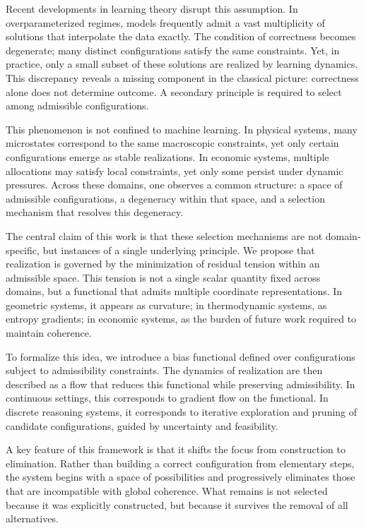 \documentclass[11pt]{article}
\theoremstyle{plain}
\theoremstyle{definition}
\theoremstyle{remark}
\begin{document}
Recent developments in learning theory disrupt this assumption. In overparameterized regimes, models frequently admit a vast multiplicity of solutions that interpolate the data exactly. The condition of correctness becomes degenerate; many distinct configurations satisfy the same constraints. Yet, in practice, only a small subset of these solutions are realized by learning dynamics. This discrepancy reveals a missing component in the classical picture: correctness alone does not determine outcome. A secondary principle is required to select among admissible configurations.

This phenomenon is not confined to machine learning. In physical systems, many microstates correspond to the same macroscopic constraints, yet only certain configurations emerge as stable realizations. In economic systems, multiple allocations may satisfy local constraints, yet only some persist under dynamic pressures. Across these domains, one observes a common structure: a space of admissible configurations, a degeneracy within that space, and a selection mechanism that resolves this degeneracy.

The central claim of this work is that these selection mechanisms are not domain-specific, but instances of a single underlying principle. We propose that realization is governed by the minimization of residual tension within an admissible space. This tension is not a single scalar quantity fixed across domains, but a functional that admits multiple coordinate representations. In geometric systems, it appears as curvature; in thermodynamic systems, as entropy gradients; in economic systems, as the burden of future work required to maintain coherence.

To formalize this idea, we introduce a bias functional defined over configurations subject to admissibility constraints. The dynamics of realization are then described as a flow that reduces this functional while preserving admissibility. In continuous settings, this corresponds to gradient flow on the functional. In discrete reasoning systems, it corresponds to iterative exploration and pruning of candidate configurations, guided by uncertainty and feasibility.

A key feature of this framework is that it shifts the focus from construction to elimination. Rather than building a correct configuration from elementary steps, the system begins with a space of possibilities and progressively eliminates those that are incompatible with global coherence. What remains is not selected because it was explicitly constructed, but because it survives the removal of all alternatives.
\end{document}
